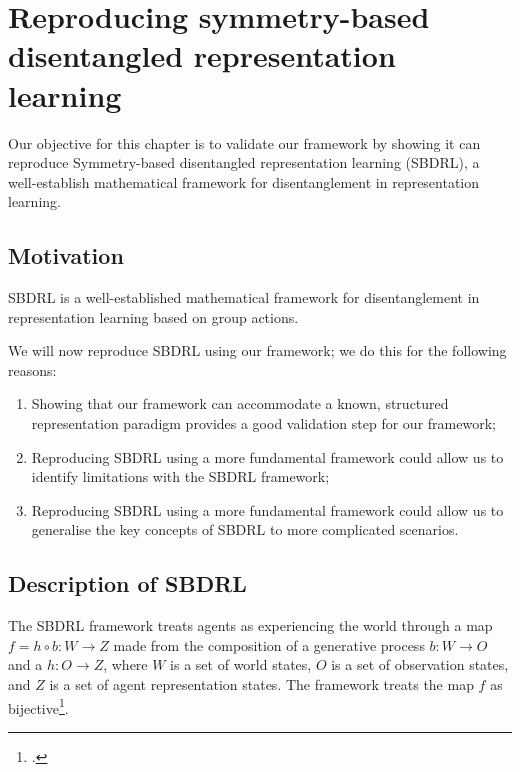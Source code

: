 \chapter{Reproducing symmetry-based disentangled representation learning}



Our objective for this chapter is to validate our framework by showing it can reproduce Symmetry-based disentangled representation learning (SBDRL), a well-establish mathematical framework for disentanglement in representation learning.

\section{Motivation}

SBDRL is a well-established mathematical framework for disentanglement in representation learning based on group actions.


We will now reproduce SBDRL using our framework; we do this for the following reasons:
\begin{enumerate}[(1)]
    \item Showing that our framework can accommodate a known, structured representation paradigm provides a good validation step for our framework;
    \item Reproducing SBDRL using a more fundamental framework could allow us to identify limitations with the SBDRL framework;
    \item Reproducing SBDRL using a more fundamental framework could allow us to generalise the key concepts of SBDRL to more complicated scenarios.
\end{enumerate}

\section{Description of SBDRL}

The SBDRL framework treats agents as experiencing the world through a map $f = h \circ b: W \to Z$ made from the composition of a generative process $b: W \to O$ and a $h: O \to Z$, where $W$ is a set of world states, $O$ is a set of observation states, and $Z$ is a set of agent representation states.
The framework treats the map $f$ as bijective\footnote{.}.

